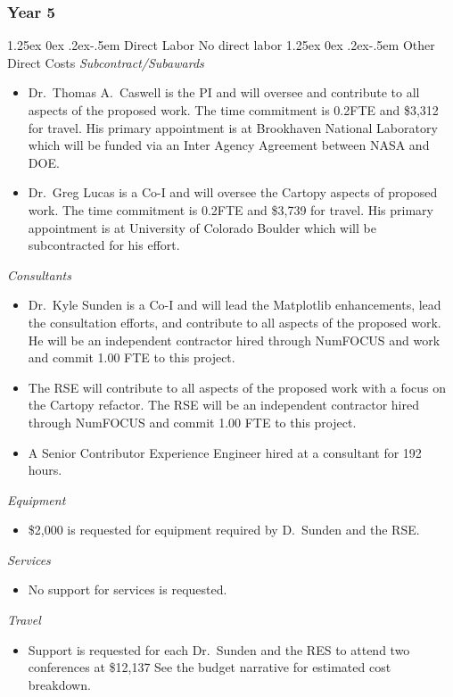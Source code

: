 \documentclass[12pt]{article}
\makeatletter
\numberwithin{page}{section}
\renewcommand{\paragraph}{%
  \@startsection{paragraph}{4}%
  {\z@}{1.25ex \@plus 0ex \@minus .2ex}{-.5em}%
  {\normalfont\normalsize\itshape\bfseries}%
}
\makeatother
\begin{document}
\subsubsection{Year 5}
\paragraph{Direct Labor}
No direct labor
\paragraph{Other Direct Costs}
\textit{Subcontract/Subawards}
\begin{itemize}
  \item Dr.\ Thomas A.\ Caswell is the PI and will oversee and contribute to
    all aspects of the proposed work.  The time commitment is 0.2FTE and \$3,312
    for travel.  His primary appointment is at Brookhaven National Laboratory
    which will be funded via an Inter Agency Agreement between NASA and DOE.
\item Dr.\ Greg Lucas is a Co-I and will oversee the Cartopy aspects of
  proposed work.  The time commitment is 0.2FTE and \$3,739 for travel.  His
  primary appointment is at University of Colorado Boulder which will be
  subcontracted for his effort.
\end{itemize}
\textit{Consultants}
\begin{itemize}
  \item Dr.\ Kyle Sunden is a Co-I and will lead the Matplotlib enhancements,
    lead the consultation efforts, and contribute to all aspects of the
    proposed work.  He will be an independent contractor hired through NumFOCUS and work and commit
    1.00 FTE to this project.
  \item The RSE will contribute to all aspects of the proposed work with a
    focus on the Cartopy refactor.  The RSE will be an independent contractor hired
    through NumFOCUS and commit 1.00 FTE to this project.
  \item A Senior Contributor Experience Engineer hired at a consultant for 192 hours.

\end{itemize}
\textit{Equipment}
\begin{itemize}
\item \$2,000 is requested for equipment required by D.\ Sunden and the RSE.
\end{itemize}
\textit{Services}
\begin{itemize}
\item No support for services is requested.
\end{itemize}
\textit{Travel}
\begin{itemize}
\item Support is requested for each Dr.\ Sunden and the RES to attend two conferences at
  \$12,137  See the budget narrative for estimated cost  breakdown.
\end{itemize}




\end{document}
